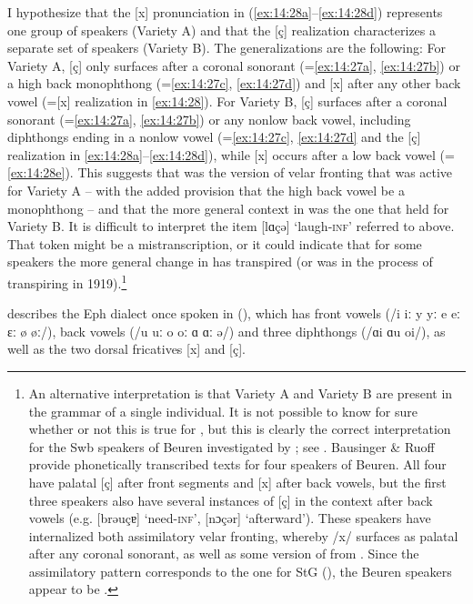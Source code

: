 I hypothesize that the [x] pronunciation in (\ref{ex:14:28a}--\ref{ex:14:28d}) represents one group of speakers (Variety A) and that the [ç] realization characterizes a separate set of speakers (Variety B). The generalizations are the following: For Variety A, [ç] only surfaces after a coronal sonorant (=\ref{ex:14:27a}, \ref{ex:14:27b}) or a high back monophthong (=\ref{ex:14:27c}, \ref{ex:14:27d}) and [x] after any other back vowel (=[x] realization in \ref{ex:14:28}). For Variety B, [ç] surfaces after a coronal sonorant (=\ref{ex:14:27a}, \ref{ex:14:27b}) or any nonlow back vowel, including diphthongs ending in a nonlow vowel (=\ref{ex:14:27c}, \ref{ex:14:27d} and the [ç] realization in \ref{ex:14:28a}--\ref{ex:14:28d}), while [x] occurs after a low back vowel (=\ref{ex:14:28e}). This suggests that  was the version of velar fronting that was active for Variety A -- with the added provision that the high back vowel be a monophthong -- and that the more general context in  was the one that held for Variety B. It is difficult to interpret the item [lɑçə] ‘laugh\textsc{{}-inf}’ referred to above. That token might be a mistranscription, or it could indicate that for some speakers the more general change in  has transpired (or was in the process of transpiring in 1919).\footnote{{An alternative interpretation is that Variety A and Variety B are present in the grammar of a single individual. It is not possible to know for sure whether or not this is true for , but this is clearly the correct interpretation for the Swb speakers of Beuren investigated by \citet{BausingerRuoff1959}; see . Bausinger \& Ruoff provide phonetically transcribed texts for four speakers of Beuren. All four have palatal [ç] after front segments and [x] after back vowels, but the first three speakers also have several instances of [ç] in the context after back vowels (e.g. [brəuçɐ] ‘need-}\textrm{\textsc{inf}}\textrm{’, [nɔçər] ‘afterward’). These speakers have internalized both assimilatory velar fronting, whereby /x/ surfaces as palatal after any coronal sonorant, as well as some version of  from . Since the assimilatory pattern corresponds to the one for StG (), the Beuren speakers appear to be .}}

\citet{Jarfe1929} describes the Eph dialect once spoken in  (), which has front vowels (/i iː y yː e eː ɛː ø øː/), back vowels (/u uː o oː ɑ ɑː ə/) and three diphthongs (/ɑi ɑu oi/), as well as the two dorsal fricatives [x] and [ç].

